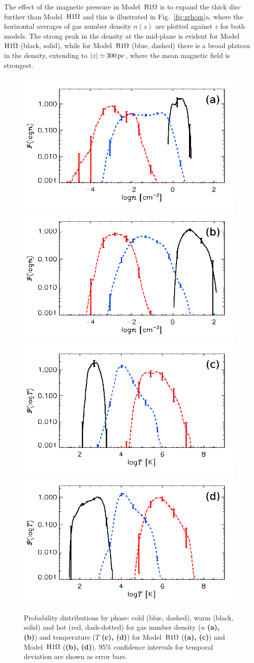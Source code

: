 \documentclass[useAMS,usenatbib]{mn2e}
\begin{document}
The effect of the magnetic pressure in Model~${\mathrm{B}1\rm{\Omega} }$ is to expand the thick disc further than Model~${\mathrm{H}1\rm{\Omega}}$ and this is illustrated in Fig.~\ref{fig:zrhom}a, where the horizontal averages of gas number density $n(z)$ are plotted against $z$ for both models. The strong peak in the density at the mid-plane is evident for Model~${\mathrm{H}1\rm{\Omega}}$ (black, solid), while for Model~${\mathrm{B}1\rm{\Omega} }$ (blue, dashed) there is a broad plateau in the density, extending to $|z|\simeq300\,{\rm pc}$, where the mean magnetic field is strongest.

  \begin{figure}
  \centering
  \includegraphics[width=0.45\linewidth]{fig/o1pr_npdf3s.png}  
  \includegraphics[width=0.45\linewidth]{fig/o1ph_npdf3s.png}\\  
  \includegraphics[width=0.45\linewidth]{fig/o1pr_tpdf3s.png}
  \includegraphics[width=0.45\linewidth]{fig/o1ph_tpdf3s.png}  
    \caption[Probability distributions by phase for $n$ and $T$]{
  Probability distributions by phase: cold (blue, dashed), warm (black, solid)
  and hot (red, dash-dotted) for gas number density ($n$ {\textbf{(a), (b)}})
  and temperature ($T$ {\textbf{(c), (d)}}) 
  for Model~${\mathrm{B}1\rm{\Omega} }$ ({\textbf{(a), (c)}}) and Model~${\mathrm{H}1\rm{\Omega}}$
  ({\textbf{(b), (d)}}). 
  95\% confidence intervals for temporal deviation are shown as error bars.   
  \label{fig:npdf3s}
    }
  \end{figure}
\end{document}
